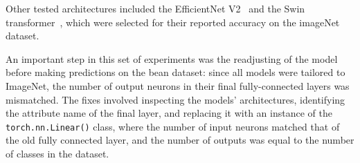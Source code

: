 Other tested architectures included the EfficientNet V2~\cite{efficientNet} and the Swin transformer~\cite{swinTransformer},
which were selected for their reported accuracy on the imageNet dataset.

An important step in this set of experiments was the readjusting of the model before making predictions on the bean dataset:
since all models were tailored to ImageNet, the number of output neurons in their final fully-connected layers was mismatched.
The fixes involved inspecting the models' architectures, identifying the attribute name of the final layer, and replacing it with an
instance of the \verb|torch.nn.Linear()| class, where the number of input neurons matched that of the old fully connected layer,
and the number of outputs was equal to the number of classes in the dataset.